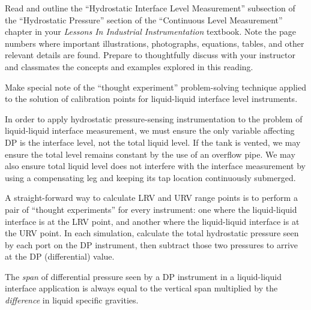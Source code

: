 

Read and outline the ``Hydrostatic Interface Level Measurement'' subsection of the ``Hydrostatic Pressure'' section of the ``Continuous Level Measurement'' chapter in your {\it Lessons In Industrial Instrumentation} textbook.  Note the page numbers where important illustrations, photographs, equations, tables, and other relevant details are found.  Prepare to thoughtfully discuss with your instructor and classmates the concepts and examples explored in this reading.

\vskip 10pt

Make special note of the ``thought experiment'' problem-solving technique applied to the solution of calibration points for liquid-liquid interface level instruments.














In order to apply hydrostatic pressure-sensing instrumentation to the problem of liquid-liquid interface measurement, we must ensure the only variable affecting DP is the interface level, not the total liquid level.  If the tank is vented, we may ensure the total level remains constant by the use of an overflow pipe.  We may also ensure total liquid level does not interfere with the interface measurement by using a compensating leg and keeping its tap location continuously submerged.

\vskip 10pt

A straight-forward way to calculate LRV and URV range points is to perform a pair of ``thought experiments'' for every instrument: one where the liquid-liquid interface is at the LRV point, and another where the liquid-liquid interface is at the URV point.  In each simulation, calculate the total hydrostatic pressure seen by each port on the DP instrument, then subtract those two pressures to arrive at the DP (differential) value.

\vskip 10pt

The {\it span} of differential pressure seen by a DP instrument in a liquid-liquid interface application is always equal to the vertical span multiplied by the {\it difference} in liquid specific gravities.










